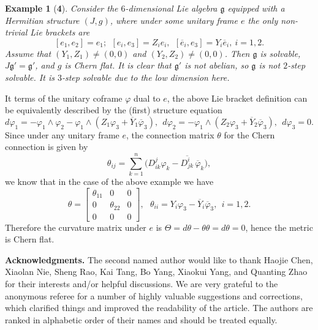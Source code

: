 \documentclass{amsart}
\newtheorem*{example}{Example}
\newcommand{\vs}{\vspace{0.5cm}}
\begin{document}
\begin{example}[{\bf 4}]
Consider the $6$-dimensional Lie algebra ${\mathfrak g}$ equipped with a Hermitian structure $(J,g)$, where under some unitary frame $e$ the only non-trivial Lie brackets are
$$ [e_1, e_2]=e_1;\ \ [e_i,e_3]=Z_ie_i,\ \ [\overline{e}_i,e_3]=Y_i\overline{e}_i, \ i=1,2. $$
Assume that $(Y_1,Z_1)\neq (0,0)$ and $(Y_2,Z_2)\neq (0,0)$. Then ${\mathfrak g}$ is solvable, $J{\mathfrak g}'={\mathfrak g}'$, and $g$ is Chern flat. It is clear that ${\mathfrak g}'$ is not abelian, so ${\mathfrak g}$ is not $2$-step solvable. It is $3$-step solvable due to the low dimension here. 
\end{example}
 
It terms of the unitary coframe $\varphi$  dual to $e$, the above Lie bracket definition can be equivalently described by the (first) structure equation
\begin{equation*}
  d\varphi_1 = -\varphi_1\wedge \varphi_2 -\varphi_1\wedge (Z_1\varphi_3+\overline{Y}_1\overline{\varphi}_3), \ \   d\varphi_2 =  -\varphi_1\wedge (Z_2\varphi_3+\overline{Y}_2\overline{\varphi}_3), \ \   d\varphi_3 = 0. 
\end{equation*}
Since under any unitary frame $e$, the connection matrix $\theta$ for the Chern connection is given by 
$$ \theta_{ij}= \sum_{k=1}^n  \big(  D^j_{ik} \varphi_k - \overline{D^i_{jk}} \,\overline{\varphi}_k \big), $$ 
we know that in the case of the above example we have 
$$ \theta = \left[ \begin{array}{ccc} \theta_{11} & 0 & 0 \\     0 & \theta_{22} & 0 \\ 0 & 0 & 0 \end{array}  \right] , \ \ \ \theta_{ii} = Y_i\varphi_3-\overline{Y}_i\overline{\varphi}_3, \ \ i=1,2. $$
Therefore the curvature matrix under $e$ is $\Theta = d\theta -\theta \theta = d\theta = 0$, hence the metric is Chern flat. 







\vspace{0.3cm}






\vs

\noindent\textbf{Acknowledgments.} The second named author would like to thank Haojie Chen, Xiaolan Nie, Sheng Rao, Kai Tang, Bo Yang, Xiaokui Yang, and Quanting Zhao for their interests and/or helpful discussions. We are very grateful to the anonymous referee for a number of highly valuable suggestions and corrections, which clarified things and improved the readability of the article. The authors are ranked in alphabetic order of their names and should be treated equally.
\end{document}
